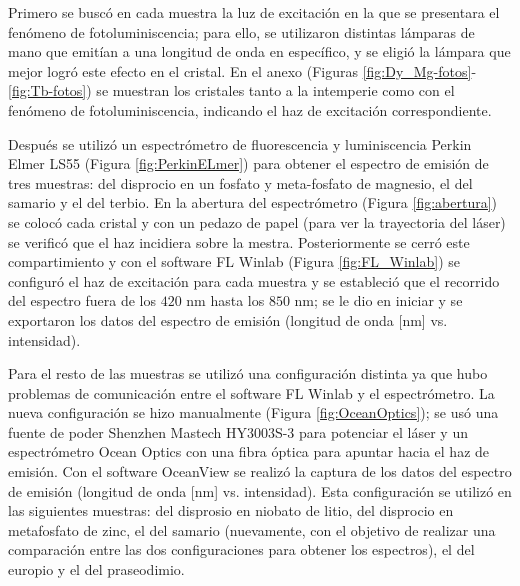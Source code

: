 Primero se buscó en cada muestra la luz de excitación en la que se presentara el fenómeno de fotoluminiscencia; para ello, se utilizaron distintas lámparas de mano que emitían a una longitud de onda en específico, y se eligió la lámpara que mejor logró este efecto en el cristal. En el anexo (Figuras \ref{fig:Dy_Mg-fotos}-\ref{fig:Tb-fotos}) se muestran los cristales tanto a la intemperie como con el fenómeno de fotoluminiscencia, indicando el haz de excitación correspondiente.

Después se utilizó un espectrómetro de fluorescencia y luminiscencia Perkin Elmer LS55 (Figura \ref{fig:PerkinELmer}) para obtener el espectro de emisión de tres muestras: del disprocio en un fosfato y meta-fosfato de magnesio, el del samario y el del terbio. En la abertura del espectrómetro (Figura \ref{fig:abertura}) se colocó cada cristal y con un pedazo de papel (para ver la trayectoria del láser) se verificó que el haz incidiera sobre la mestra. Posteriormente se cerró este compartimiento y con el software FL Winlab (Figura \ref{fig:FL_Winlab}) se configuró el haz de excitación para cada muestra y se estableció que el recorrido del espectro fuera de los $420$ nm hasta los $850$ nm; se le dio en iniciar y se exportaron los datos del espectro de emisión (longitud de onda [nm] vs. intensidad).

Para el resto de las muestras se utilizó una configuración distinta ya que hubo problemas de comunicación entre el software FL Winlab y el espectrómetro. La nueva configuración se hizo manualmente (Figura \ref{fig:OceanOptics}); se usó una fuente de poder Shenzhen Mastech HY3003S-3 para potenciar el láser y un espectrómetro Ocean Optics con una fibra óptica para apuntar hacia el haz de emisión. Con el software OceanView se realizó la captura de los datos del espectro de emisión (longitud de onda [nm] vs. intensidad). Esta configuración se utilizó en las siguientes muestras: del disprosio en niobato de litio, del disprocio en metafosfato de zinc, el del samario (nuevamente, con el objetivo de realizar una comparación entre las dos configuraciones para obtener los espectros), el del europio y el del praseodimio.